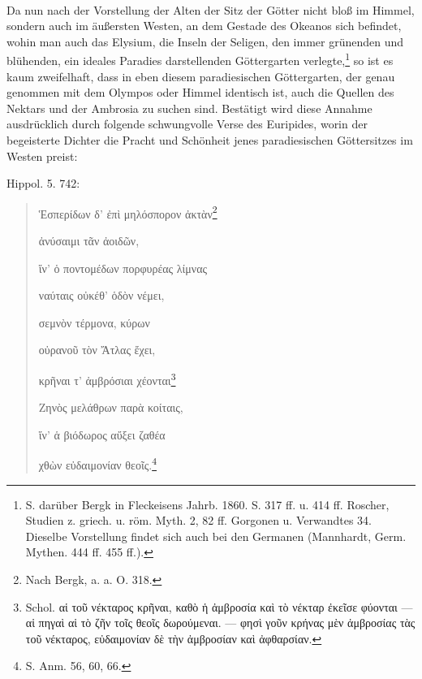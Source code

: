 \documentclass[a4paper, 11pt, oneside]{article}
\begin{document}
\paragraph{}
Da nun nach der Vorstellung der Alten der Sitz der Götter nicht bloß im Himmel, sondern auch im äußersten Westen, an dem Gestade des Okeanos sich befindet, wohin man auch das Elysium, die Inseln der Seligen, den immer grünenden und blühenden, ein ideales Paradies darstellenden Göttergarten verlegte,\footnote{S. darüber Bergk in Fleckeisens Jahrb. 1860. S. 317 ff. u. 414 ff. Roscher, Studien z. griech. u. röm. Myth. 2, 82 ff. Gorgonen u. Verwandtes 34. Dieselbe Vorstellung findet sich auch bei den Germanen (Mannhardt, Germ. Mythen. 444 ff. 455 ff.).} so ist es kaum zweifelhaft, dass in eben diesem paradiesischen Göttergarten, der genau genommen mit dem Olympos oder Himmel identisch ist, auch die Quellen des Nektars und der Ambrosia zu suchen sind. Bestätigt wird diese Annahme ausdrücklich durch folgende schwungvolle Verse des Euripides, worin der begeisterte Dichter die Pracht und Schönheit jenes paradiesischen Göttersitzes im Westen preist:

Hippol. 5. 742:
\begin{quotation}
Ἑσπερίδων δ' ἐπὶ μηλόσπορον ἀκτὰν\footnote{Nach Bergk, a. a. O. 318.}

ἀνύσαιμι τᾶν ἀοιδῶν,

ἵν' ὁ ποντομέδων πορφυρέας λίμνας

ναύταις οὐκέθ' ὁδὸν νέμει,

σεμνὸν τέρμονα, κύρων

οὐρανοῦ τὸν Ἄτλας ἔχει,

κρῆναι τ' ἀμβρόσιαι χέονται\footnote{Schol. αἱ τοῦ νέκταρος κρῆναι, καθὸ ἡ ἀμβροσία καὶ τὸ νέκταρ ἐκεῖσε φύονται --- αἱ πηγαὶ αἱ τὸ ζῆν τοῖς θεοῖς δωρούμεναι. --- φησὶ γοῦν κρήνας μὲν ἀμβροσίας τὰς τοῦ νέκταρος, εὐδαιμονίαν δὲ τὴν ἀμβροσίαν καὶ ἀφθαρσίαν.}

Ζηνὸς μελάθρων παρὰ κοίταις,

ἵν' ἁ βιόδωρος αὔξει ζαθέα

χθὼν εὐδαιμονίαν θεοῖς.\footnote{S. Anm. 56, 60, 66.}
\end{quotation}
\end{document}
